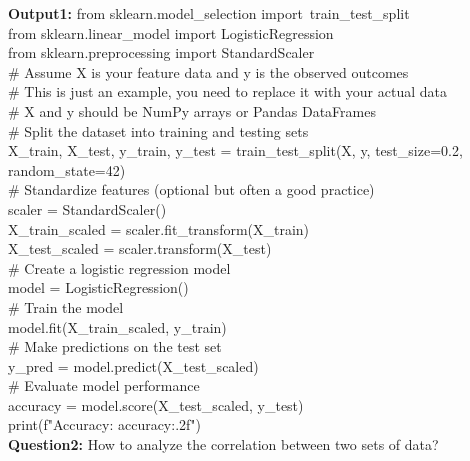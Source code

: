 \documentclass[UTF8]{ctexart} %
\begin{document}
\textbf{Output1:}
from sklearn.model\_selection import\ train\_test\_split\\
from sklearn.linear\_model import LogisticRegression\\
from sklearn.preprocessing import StandardScaler\\
\# Assume X is your feature data and y is the observed outcomes\\
\# This is just an example, you need to replace it with your actual data\\
\# X and y should be NumPy arrays or Pandas DataFrames\\
\# Split the dataset into training and testing sets\\
X\_train, X\_test, y\_train, y\_test = train\_test\_split(X, y, test\_size=0.2, random\_state=42)\\
\# Standardize features (optional but often a good practice)\\
scaler = StandardScaler()\\
X\_train\_scaled = scaler.fit\_transform(X\_train)\\
X\_test\_scaled = scaler.transform(X\_test)\\
\# Create a logistic regression model\\
model = LogisticRegression()\\
\# Train the model\\
model.fit(X\_train\_scaled, y\_train)\\
\# Make predictions on the test set\\
y\_pred = model.predict(X\_test\_scaled)\\
\# Evaluate model performance\\
accuracy = model.score(X\_test\_scaled, y\_test)\\
print(f"Accuracy: {accuracy:.2f}")\\

\vspace*{2ex}
\textbf{Question2:} 
How to analyze the correlation between two sets of data?
\end{document}
